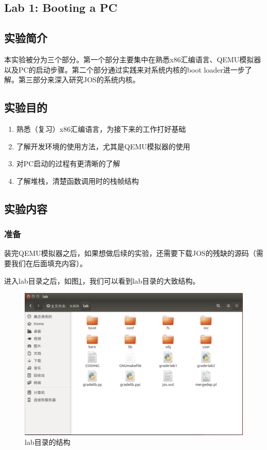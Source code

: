 \begin{ExerciseList}
\section{Lab 1: Booting a PC}

\subsection{实验简介}

本实验被分为三个部分。第一个部分主要集中在熟悉x86汇编语言、QEMU模拟器以及PC的启动步骤。第二个部分通过实践来对系统内核的boot loader进一步了解。第三部分来深入研究JOS的系统内核。

\subsection{实验目的}

\begin{enumerate}
\item 熟悉（复习）x86汇编语言，为接下来的工作打好基础
\item 了解开发环境的使用方法，尤其是QEMU模拟器的使用
\item 对PC启动的过程有更清晰的了解
\item 了解堆栈，清楚函数调用时的栈帧结构
\end{enumerate}

\subsection{实验内容}

\subsubsection{准备}

装完QEMU模拟器之后，如果想做后续的实验，还需要下载JOS的残缺的源码（需要我们在后面填充内容）。


进入lab目录之后，如图\ref{fig:lab1:jos}，我们可以看到lab目录的大致结构。

\begin{figure}[H]
  \centering
  \includegraphics[width=6in]{figures/lab1/jos.png}
  \caption{lab目录的结构}\label{fig:lab1:jos}
\end{figure}


\end{ExerciseList}
